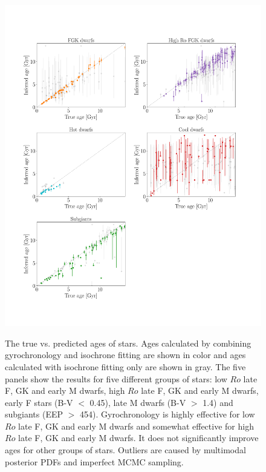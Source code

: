 \begin{figure}
  \caption{
The true vs. predicted ages of stars.
    Ages calculated by combining gyrochronology
    and isochrone fitting are shown in color and ages calculated with
    isochrone fitting only are shown in gray.
The five panels show the results for five different groups of stars: low $Ro$
late F, GK and early M dwarfs, high $Ro$ late F, GK and early M dwarfs, early
    F stars (B-V $<$ 0.45), late M dwarfs (B-V $>$ 1.4) and subgiants
    (EEP $>$ 454).
Gyrochronology is highly effective for low $Ro$ late F, GK and early M dwarfs
and somewhat effective for high $Ro$ late F, GK and early M dwarfs.
It does not significantly improve ages for other groups of stars.
Outliers are caused by multimodal posterior PDFs and imperfect MCMC sampling.
}
  \centering
    \includegraphics[width=1\textwidth]{simulation_results}
\label{fig:simulation_results}
\end{figure}

